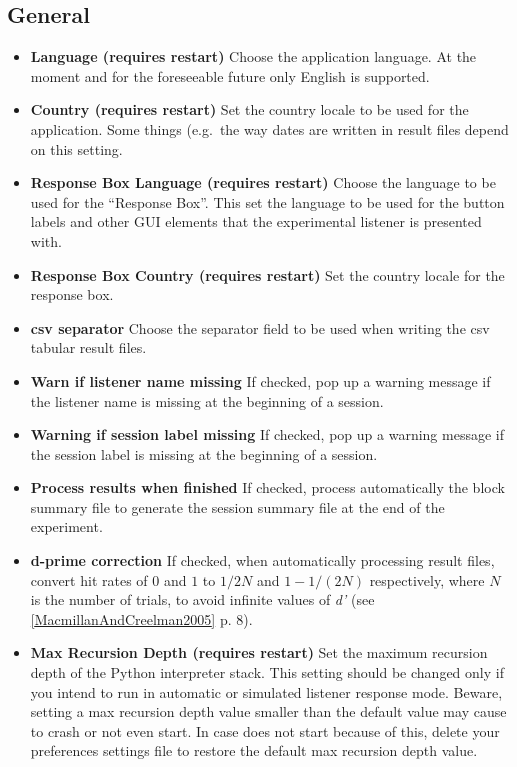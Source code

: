 \documentclass[a4paper,12pt,english]{sphinxmanual}
\begin{document}
\subsection{General}
\label{graphical_user_interface:general}\label{graphical_user_interface:sec-edit-pref-dia-gen}\begin{itemize}
\item {} 
\textbf{Language (requires restart)} Choose the application language. At
the moment and for the foreseeable future only English is supported.

\item {} 
\textbf{Country (requires restart)} Set the country locale to be used for
the application. Some things (e.g. the way dates are written in
result files depend on this setting.

\item {} 
\textbf{Response Box Language (requires restart)} Choose the language to
be used for the “Response Box”. This set the language to be used for
the button labels and other GUI elements that the experimental
listener is presented with.

\item {} 
\textbf{Response Box Country (requires restart)} Set the country locale
for the response box.

\item {} 
\textbf{csv separator} Choose the separator field to be used when writing
the csv tabular result files.

\item {} 
\textbf{Warn if listener name missing} If checked, pop up a warning
message if the listener name is missing at the beginning of a
session.

\item {} 
\textbf{Warning if session label missing} If checked, pop up a warning
message if the session label is missing at the beginning of a
session.

\item {} 
\textbf{Process results when finished} If checked, process automatically
the block summary file to generate the session summary file at the
end of the experiment.

\item {} 
\textbf{d-prime correction} If checked, when automatically processing
result files, convert hit rates of $0$ and $1$ to
$1/2N$ and $1-1/(2N)$ respectively, where $N$ is
the number of trials, to avoid infinite values of \emph{d’}
(see {\hyperref[references:macmillanandcreelman2005]{{[}MacmillanAndCreelman2005{]}}} p. 8).

\item {} 
\textbf{Max Recursion Depth (requires restart)} Set the maximum recursion
depth of the Python interpreter stack. This setting should be changed
only if you intend to run  in automatic or
simulated listener response mode. Beware, setting a max recursion
depth value smaller than the default value may cause
 to crash or not even start. In case
 does not start because of this, delete your
preferences settings file to restore the default max recursion depth
value.

\end{itemize}
\end{document}
